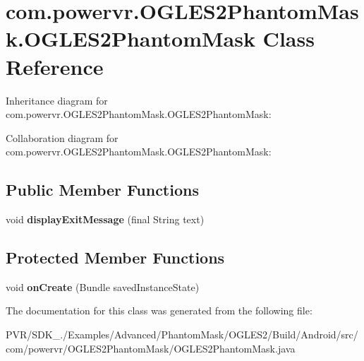 \hypertarget{classcom_1_1powervr_1_1_o_g_l_e_s2_phantom_mask_1_1_o_g_l_e_s2_phantom_mask}{\section{com.\+powervr.\+O\+G\+L\+E\+S2\+Phantom\+Mask.\+O\+G\+L\+E\+S2\+Phantom\+Mask Class Reference}
\label{classcom_1_1powervr_1_1_o_g_l_e_s2_phantom_mask_1_1_o_g_l_e_s2_phantom_mask}
}


Inheritance diagram for com.\+powervr.\+O\+G\+L\+E\+S2\+Phantom\+Mask.\+O\+G\+L\+E\+S2\+Phantom\+Mask\+:


Collaboration diagram for com.\+powervr.\+O\+G\+L\+E\+S2\+Phantom\+Mask.\+O\+G\+L\+E\+S2\+Phantom\+Mask\+:
\subsection*{Public Member Functions}
\begin{DoxyCompactItemize}
\item 
\hypertarget{classcom_1_1powervr_1_1_o_g_l_e_s2_phantom_mask_1_1_o_g_l_e_s2_phantom_mask_a57b58915f05b88bf9697dcef3a075fc1}{void {\bfseries display\+Exit\+Message} (final String text)}\label{classcom_1_1powervr_1_1_o_g_l_e_s2_phantom_mask_1_1_o_g_l_e_s2_phantom_mask_a57b58915f05b88bf9697dcef3a075fc1}

\end{DoxyCompactItemize}
\subsection*{Protected Member Functions}
\begin{DoxyCompactItemize}
\item 
\hypertarget{classcom_1_1powervr_1_1_o_g_l_e_s2_phantom_mask_1_1_o_g_l_e_s2_phantom_mask_a84a94456eca25f21838703da047cc35c}{void {\bfseries on\+Create} (Bundle saved\+Instance\+State)}\label{classcom_1_1powervr_1_1_o_g_l_e_s2_phantom_mask_1_1_o_g_l_e_s2_phantom_mask_a84a94456eca25f21838703da047cc35c}

\end{DoxyCompactItemize}


The documentation for this class was generated from the following file\+:\begin{DoxyCompactItemize}
\item 
P\+V\+R/\+S\+D\+K\+\_./\+Examples/\+Advanced/\+Phantom\+Mask/\+O\+G\+L\+E\+S2/\+Build/\+Android/src/com/powervr/\+O\+G\+L\+E\+S2\+Phantom\+Mask/O\+G\+L\+E\+S2\+Phantom\+Mask.\+java\end{DoxyCompactItemize}
